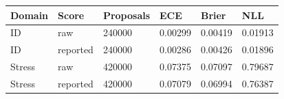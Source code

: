 \begin{tabular}{llllll}
\toprule
Domain & Score & Proposals & ECE & Brier & NLL \\
\midrule
ID & raw & 240000 & 0.00299 & 0.00419 & 0.01913 \\
ID & reported & 240000 & 0.00286 & 0.00426 & 0.01896 \\
Stress & raw & 420000 & 0.07375 & 0.07097 & 0.79687 \\
Stress & reported & 420000 & 0.07079 & 0.06994 & 0.76387 \\
\bottomrule
\end{tabular}

